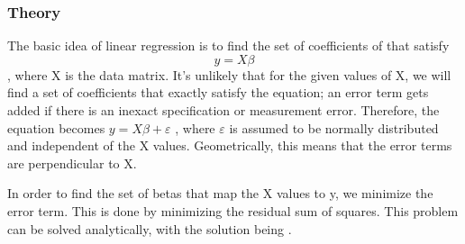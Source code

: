\documentclass[SKL-MASTER.tex]{subfiles}
\begin{document}
\subsubsection{Theory}
The basic idea of linear regression is to find the set of coefficients of that satisfy \[y = X \beta\] ,
where X is the data matrix. It's unlikely that for the given values of X, we will find a set of
coefficients that exactly satisfy the equation; an error term gets added if there is an inexact
specification or measurement error. Therefore, the equation becomes $y = X \beta + \varepsilon$ , where $\varepsilon$
is assumed to be normally distributed and independent of the X values. Geometrically, this
means that the error terms are perpendicular to X. 


In order to find the set of betas that map the X values to y, we minimize the error term.
This is done by minimizing the residual sum of squares.
This problem can be solved analytically, with the solution being .
\end{document}
